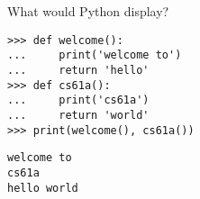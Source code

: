 \question What would Python display?
\begin{lstlisting}
>>> def welcome():
...     print('welcome to')
...     return 'hello'
>>> def cs61a():
...     print('cs61a')
...     return 'world'
>>> print(welcome(), cs61a())
\end{lstlisting}

\begin{solution}[1.5in]
\begin{lstlisting}
welcome to
cs61a
hello world
\end{lstlisting}
\end{solution}
